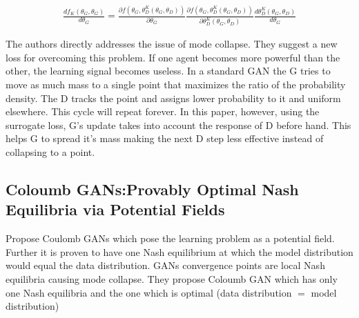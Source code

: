 \begin{equation*}
    \begin{aligned}
    \frac{df_{K}(\theta_{G}, \theta_{G})}{d\theta_{G}} = \frac{\partial f(\theta_{G}, \theta^K_{D}(\theta_{G}, \theta_{D}))}{\partial \theta_{G}} 
    \frac{\partial f(\theta_{G}, \theta^K_{D}(\theta_{G}, \theta_{D}))}{\partial \theta^K_{D}(\theta_{G}, \theta_{D}) } \frac{ d\theta^K_{D}(\theta_{G}, \theta_{D})}{d\theta_{G}}
    \end{aligned}{}
\end{equation*}{}

The authors directly addresses the issue of mode collapse. They suggest a new loss for overcoming this problem. If one agent becomes more powerful than the other, the learning signal becomes useless. In a standard GAN the G tries to move as much mass to a single point that maximizes the ratio of the probability density. The D tracks the point and assigns lower probability to it and uniform elsewhere. This cycle will repeat forever. In this paper, however, using the surrogate loss, G's update takes into account the response of D before hand. This helps G to spread it's mass making the next D step less effective instead of collapsing to a point.
\subsection*{Coloumb GANs:Provably Optimal Nash Equilibria via Potential Fields \citep{coulomb}}
Propose Coulomb GANs which pose the learning problem as a potential field. Further it is proven to have one Nash equilibrium at which the model distribution would equal the data distribution. GANs convergence points are local Nash equilibria causing mode collapse. They propose Coloumb GAN which has only one Nash equilibria and the one which is optimal (data distribution $=$ model distribution)

